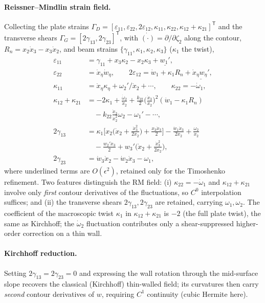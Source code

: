 \documentclass[preprint,12pt]{elsarticle}
\newcommand{\T}{^{\mathsf{T}}}
\newcommand{\eps}{\varepsilon}
\begin{document}
\paragraph{Reissner--Mindlin strain field.} Collecting the plate strains
$\Gamma_D=[\eps_{11},\eps_{22},2\eps_{12},\kappa_{11},\kappa_{22},
\kappa_{12}{+}\kappa_{21}]\T$ and the transverse shears
$\Gamma_G=[2\gamma_{13},2\gamma_{23}]\T$, with $\dot{(\cdot)}=\partial/\partial
\zeta_2$ along the contour, $R_n=x_2\dot{x}_3-x_3\dot{x}_2$, and beam strains
$\{\gamma_{11},\kappa_1,\kappa_2,\kappa_3\}$ ($\kappa_1$ the twist),
\begin{align}
\eps_{11}&=\gamma_{11}+x_3\kappa_2-x_2\kappa_3+\underline{w_1'},\\
\eps_{22}&=\dot{x}_\eta\dot{w}_\eta,\qquad
2\eps_{12}=\dot{w}_1+\kappa_1 R_n+\underline{\dot{x}_\eta w_\eta'},\\
\kappa_{11}&=\dot{x}_\eta\kappa_\eta+\omega_2'/\dot{x}_2+\cdots,\qquad
\kappa_{22}=-\dot{\omega}_1,\\
\kappa_{12}{+}\kappa_{21}&=-2\kappa_1+\frac{\dot{\omega}_2}{\dot{x}_2}
+\frac{k_{22}}{2}\Big(\frac{\dot{x}_3}{\dot{x}_2}\Big)^{\!2}(\dot{w}_1-\kappa_1 R_n)
\nonumber\\ &\quad
-k_{22}\frac{\dot{x}_3}{\dot{x}_2^{2}}\omega_2-\omega_1'-\cdots,\\
2\gamma_{13}&=\kappa_1\Big[x_2\Big(\dot{x}_2+\frac{\dot{x}_3^{2}}{2\dot{x}_2}\Big)
+\frac{x_3\dot{x}_3}{2}\Big]-\frac{\dot{w}_1\dot{x}_3}{2\dot{x}_2}
+\frac{\omega_2}{\dot{x}_2}
\nonumber\\ &\quad
-\frac{w_2'\dot{x}_3}{2}+w_3'\Big(\dot{x}_2+\frac{\dot{x}_3^{2}}{2\dot{x}_2}\Big),\\
2\gamma_{23}&=\dot{w}_3\dot{x}_2-\dot{w}_2\dot{x}_3-\omega_1,
\label{eq:rmstrain}
\end{align}
where underlined terms are $O(\epsilon^2)$, retained only for the Timoshenko
refinement. Two features distinguish the RM field: (i) $\kappa_{22}=-\dot
\omega_1$ and $\kappa_{12}{+}\kappa_{21}$ involve only \emph{first} contour
derivatives of the fluctuations, so $C^0$ interpolation suffices; and (ii) the
transverse shears $2\gamma_{13},2\gamma_{23}$ are retained, carrying
$\omega_1,\omega_2$. The coefficient of the macroscopic twist $\kappa_1$ in
$\kappa_{12}{+}\kappa_{21}$ is $-2$ (the full plate twist), the same as Kirchhoff;
the $\dot\omega_2$ fluctuation contributes only a shear-suppressed higher-order
correction on a thin wall.

\paragraph{Kirchhoff reduction.} Setting $2\gamma_{13}=2\gamma_{23}=0$ and
expressing the wall rotation through the mid-surface slope recovers the
classical (Kirchhoff) thin-walled field; its curvatures then carry \emph{second}
contour derivatives of $w$, requiring $C^1$ continuity (cubic Hermite here).
\end{document}
